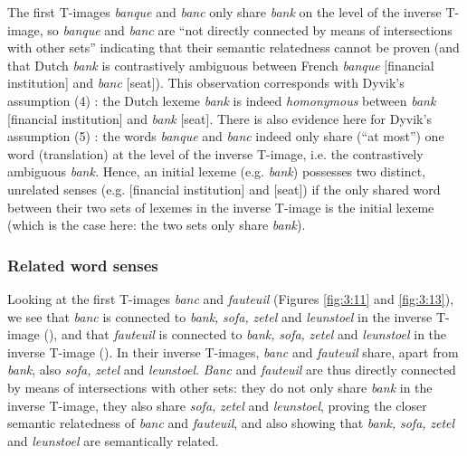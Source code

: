 The first T-images \textit{banque} and \textit{banc} only share \textit{bank} on the level of the inverse T-image, so \textit{banque} and \textit{banc} are “not directly connected by means of intersections with other sets” \citep[32]{langemets_translations_2005} indicating that their semantic relatedness cannot be proven (and that Dutch \textit{bank} is contrastively ambiguous between French \textit{banque} [financial institution] and \textit{banc} [seat]). This observation corresponds with Dyvik’s assumption (4) \citep[31--32]{langemets_translations_2005}: the Dutch lexeme \textit{bank} is indeed \textit{homonymous} between \textit{bank} [financial institution] and \textit{bank} [seat]. There is also evidence here for Dyvik’s assumption (5) \citep[31--32]{langemets_translations_2005}: the words \textit{banque} and \textit{banc} indeed only share (“at most”) one word (translation) at the level of the inverse T-image, i.e. the contrastively ambiguous \textit{bank.} Hence, an initial lexeme (e.g. \textit{bank}) possesses two distinct, unrelated senses (e.g. [financial institution] and [seat]) if the only shared word between their two sets of lexemes in the inverse T-image is the initial lexeme (which is the case here: the two sets only share \textit{bank}).

\subsubsection{Related word senses}
\label{sec:3.4.3.2}
Looking at the first T-images \textit{banc} and \textit{fauteuil} (Figures \ref{fig:3:11} and \ref{fig:3:13}), we see that \textit{banc} is connected to \textit{bank,} \textit{sofa,} \textit{zetel} and \textit{leunstoel} in the inverse T-image (), and that \textit{fauteuil} is connected to \textit{bank,} \textit{sofa,} \textit{zetel} and \textit{leunstoel} in the inverse T-image (). In their inverse T-images, \textit{banc} and \textit{fauteuil} share, apart from \textit{bank}, also \textit{sofa,} \textit{zetel} and \textit{leunstoel}. \textit{Banc} and \textit{fauteuil} are thus directly connected by means of intersections with other sets: they do not only share \textit{bank} in the inverse T-image, they also share \textit{sofa,} \textit{zetel} and \textit{leunstoel}, proving the closer semantic relatedness of \textit{banc} and \textit{fauteuil}, and also showing that \textit{bank,} \textit{sofa,} \textit{zetel} and \textit{leunstoel} are semantically related.


